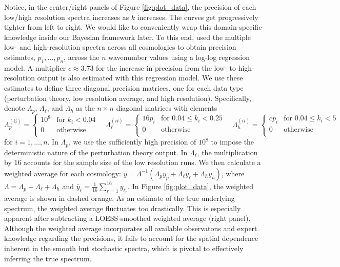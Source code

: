 \documentclass[11pt]{article}
\begin{document}
Notice, in the center/right panels of Figure \ref{fig:plot_data}, the precision of each
low/high resolution spectra increases as $k$ increases.  The curves get progressively 
tighter from left to right.  We would like to conveniently wrap this domain-specific 
knowledge inside our Bayesian framework later.  To this end, \cite{moran2023mira} 
used the multiple low- and high-resolution spectra across all cosmologies to
obtain precision estimates, $p_1,\dots, p_n$, across the $n$ 
wavenumber values using a log-log regression model. A multiplier $c\approx 3.73$ for 
the increase in precision from the low- to high- resolution output is also 
estimated with this regression model. 
We use these estimates to define three 
diagonal precision matrices, one for each data type (perturbation theory, 
low resolution average, and high resolution). Specifically, denote $\Lambda_p$, 
$\Lambda_\ell$, and $\Lambda_h$ as the $n\times n$ diagonal matrices with elements
\begin{equation}\label{eq:lambda}
\Lambda_p^{(ii)} = \begin{cases}
    10^8 &\text{for } k_i < 0.04 \\
    0  &\text{otherwise}\\
    \end{cases}
\quad
\Lambda_\ell^{(ii)} = \begin{cases}
    16p_i &\text{for } 0.04 \leq k_i < 0.25 \\
    0  &\text{otherwise}\\
    \end{cases}
\quad
\Lambda_h^{(ii)} = \begin{cases}
    cp_i &\text{for } 0.04 \leq k_i < 5 \\
    0  &\text{otherwise}\\
    \end{cases}
\end{equation}
for $i=1,\dots, n$.  In $\Lambda_p$, we use the sufficiently high precision 
of $10^8$ to impose the deterministic nature of the perturbation theory output.
In $\Lambda_\ell$, the multiplication by 16 accounts for the sample size of the
low resolution runs.
We then calculate a weighted average for each cosmology: 
$\bar y = \Lambda^{-1}(\Lambda_p y_p + \Lambda_{\ell} \bar{y}_\ell + \Lambda_h y_h)$, 
where $\Lambda = \Lambda_p + \Lambda_\ell + \Lambda_h$ and 
$\bar{y}_\ell = \frac{1}{16}\sum_{r=1}^{16} y_{\ell_r}$. In Figure \ref{fig:plot_data},
the weighted average is shown in dashed orange.  As an estimate of the true
underlying spectrum, the weighted average fluctuates too drastically.  
This is especially apparent after subtracting a LOESS-smoothed weighted average (right panel).
Although the weighted average incorporates all available observatons and 
expert knowledge regarding the precisions, it fails to account for the spatial 
dependence inherent in the smooth but stochastic spectra, which is pivotal to 
effectively inferring the true spectrum.
\end{document}
